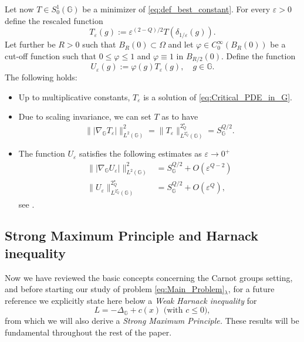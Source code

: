 \documentclass[11pt]{amsart}
\numberwithin{equation}{section} %
\theoremstyle{definition}
\begin{document}
 Let now $T \in S^{1}_{0}(\mathbb{G})$ be a minimizer of \eqref{eq:def_best_constant}. For every $\varepsilon >0$ define the rescaled function
\begin{equation}\label{eq:Minimi_riscalati}
	T_{\varepsilon}(g) := \varepsilon^{(2-Q)/2} T \left(\delta_{1/\varepsilon}(g)\right).
\end{equation}
Let further be $R>0$ such that $B_{R}(0)\subset \Omega$ and let $\varphi \in C^{\infty}_{0}(B_{R}(0))$ be a cut-off function such that $0\leq \varphi \leq 1$ and $\varphi \equiv 1$ in $B_{R/2}(0)$. Define the function 
\begin{equation}\label{eq:def_u_varepsilon}
	U_{\varepsilon}(g):= \varphi(g) T_{\varepsilon}(g), \quad g \in \mathbb{G}.
\end{equation}
The following holds:
\begin{itemize}
	\item Up to multiplicative constants, $T_{\varepsilon}$ is a solution of \eqref{eq:Critical_PDE_in_G}.
	\item Due to scaling invariance, we can set $T$ as to have
	\begin{equation}
		\| |\nabla_{\mathbb{G}}T_{\varepsilon}|\|^{2}_{L^{2}(\mathbb{G})} = \| T_{\varepsilon}\|^{2^{\star}_{Q}}_{L^{2_{Q}^{\star}}(\mathbb{G})} = S_{\mathbb{G}}^{Q/2}.
	\end{equation}
	\item The function $U_{\varepsilon}$ satisfies the following estimates as $\varepsilon \to 0^{+}$
	\begin{align}
		\| |\nabla_{\mathbb{G}}U_{\varepsilon}|\|^{2}_{L^{2}(\mathbb{G})} & =  S_{\mathbb{G}}^{Q/2} + O(\varepsilon^{Q-2}) \label{eq:Stima_grad_u_varepsilon}\\
		 \|U_{\varepsilon}\|^{2^{\star}_{Q}}_{L^{2_{Q}^{\star}}(\mathbb{G})}& = S_{\mathbb{G}}^{Q/2} + O(\varepsilon^{Q}) \label{eq:Stima_u_varepsilon}, 
	\end{align}
	\noindent see \cite[Lemma 3.3]{Loiudice1}.
\end{itemize}	

\subsection{Strong Maximum Principle and Harnack inequality} Now we have reviewed
the basic concepts concerning the Carnot groups setting, and before starting
our study of problem \eqref{eq:Main_Problem}$_\lambda$, for a future reference 
we explicitly
state here below a \emph{Weak Harnack inequality} for 
$$\text{$L = -\Delta_\mathbb{G}+c(x)$ (with $c\leq 0$)},$$
from which we will also derive a \emph{Strong Maximum Principle.}
These results will be fundamental throughout the rest of the paper.
\end{document}
